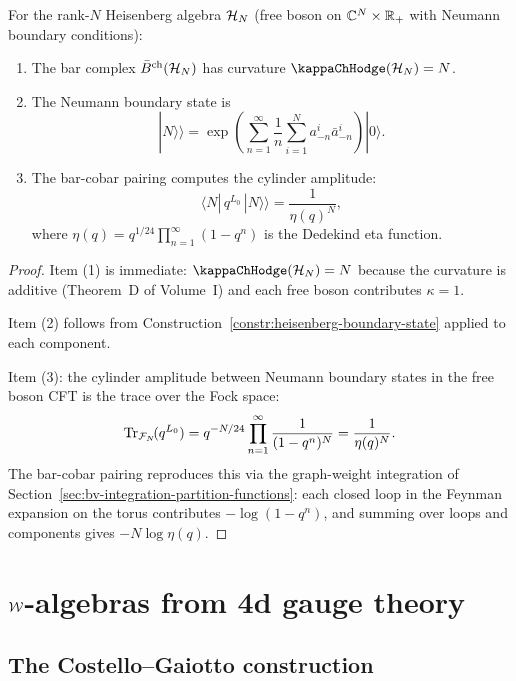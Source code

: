 \begin{corollary}
For the rank-$N$ Heisenberg algebra $\mathcal{H}_N$ (free boson on
$\mathbb{C}^N \times \mathbb{R}_+$ with Neumann boundary conditions):
\begin{enumerate}
\item The bar complex $\bar{B}^{\mathrm{ch}}(\mathcal{H}_N)$ has curvature
 $\kappaChHodge(\cH_N) = N$.
\item The Neumann boundary state is
 \[
 |N\rangle\!\rangle
 = \exp\!\left(\sum_{n=1}^{\infty} \frac{1}{n}
 \sum_{i=1}^{N} a^i_{-n} \bar{a}^i_{-n}\right) |0\rangle.
 \]
\item The bar-cobar pairing computes the cylinder amplitude:
 \[
 \langle N| \, q^{L_0} \, |N\rangle\!\rangle
 = \frac{1}{\eta(q)^N},
 \]
 where $\eta(q) = q^{1/24} \prod_{n=1}^{\infty} (1 - q^n)$ is the
 Dedekind eta function.
\end{enumerate}
\end{corollary}

\begin{proof}
Item (1) is immediate: $\kappaChHodge(\cH_N) = N$ because the curvature is
additive (Theorem~D of Volume~I) and each free boson contributes
$\kappa = 1$.

Item (2) follows from Construction~\ref{constr:heisenberg-boundary-state}
applied to each component.

Item (3): the cylinder amplitude between Neumann boundary states in the
free boson CFT is the trace over the Fock space:
\[
\operatorname{Tr}_{\mathcal{F}_N}\!(q^{L_0})
 = q^{-N/24} \prod_{n=1}^{\infty} \frac{1}{(1-q^n)^N}
 = \frac{1}{\eta(q)^N}.
\]
The bar-cobar pairing reproduces this via the graph-weight integration
of Section~\ref{sec:bv-integration-partition-functions}: each closed
loop in the Feynman expansion on the torus contributes $-\log(1 - q^n)$,
and summing over loops and components gives $-N \log \eta(q)$.
\end{proof}



\section{\texorpdfstring{$\mathcal{W}$}{W}-algebras from 4d gauge theory}

\subsection{The Costello--Gaiotto construction}


